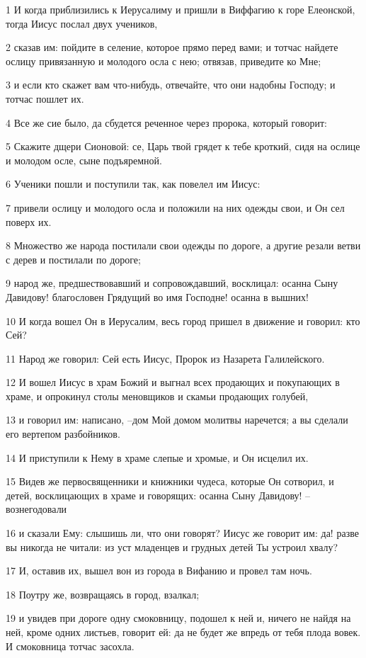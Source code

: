 \par 1 И когда приблизились к Иерусалиму и пришли в Виффагию к горе Елеонской, тогда Иисус послал двух учеников,
\par 2 сказав им: пойдите в селение, которое прямо перед вами; и тотчас найдете ослицу привязанную и молодого осла с нею; отвязав, приведите ко Мне;
\par 3 и если кто скажет вам что-нибудь, отвечайте, что они надобны Господу; и тотчас пошлет их.
\par 4 Все же сие было, да сбудется реченное через пророка, который говорит:
\par 5 Скажите дщери Сионовой: се, Царь твой грядет к тебе кроткий, сидя на ослице и молодом осле, сыне подъяремной.
\par 6 Ученики пошли и поступили так, как повелел им Иисус:
\par 7 привели ослицу и молодого осла и положили на них одежды свои, и Он сел поверх их.
\par 8 Множество же народа постилали свои одежды по дороге, а другие резали ветви с дерев и постилали по дороге;
\par 9 народ же, предшествовавший и сопровождавший, восклицал: осанна Сыну Давидову! благословен Грядущий во имя Господне! осанна в вышних!
\par 10 И когда вошел Он в Иерусалим, весь город пришел в движение и говорил: кто Сей?
\par 11 Народ же говорил: Сей есть Иисус, Пророк из Назарета Галилейского.
\par 12 И вошел Иисус в храм Божий и выгнал всех продающих и покупающих в храме, и опрокинул столы меновщиков и скамьи продающих голубей,
\par 13 и говорил им: написано, --дом Мой домом молитвы наречется; а вы сделали его вертепом разбойников.
\par 14 И приступили к Нему в храме слепые и хромые, и Он исцелил их.
\par 15 Видев же первосвященники и книжники чудеса, которые Он сотворил, и детей, восклицающих в храме и говорящих: осанна Сыну Давидову! --вознегодовали
\par 16 и сказали Ему: слышишь ли, что они говорят? Иисус же говорит им: да! разве вы никогда не читали: из уст младенцев и грудных детей Ты устроил хвалу?
\par 17 И, оставив их, вышел вон из города в Вифанию и провел там ночь.
\par 18 Поутру же, возвращаясь в город, взалкал;
\par 19 и увидев при дороге одну смоковницу, подошел к ней и, ничего не найдя на ней, кроме одних листьев, говорит ей: да не будет же впредь от тебя плода вовек. И смоковница тотчас засохла.
